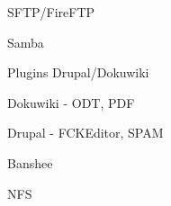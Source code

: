 \documentclass[spanish]{beamer}
\begin{document}
\begin{frame}{SFTP/FireFTP}
\end{frame}
\begin{frame}{Samba}
\end{frame}
\begin{frame}{Plugins Drupal/Dokuwiki}
\end{frame}
\begin{frame}{Dokuwiki - ODT, PDF}
\end{frame}
\begin{frame}{Drupal - FCKEditor, SPAM}
\end{frame}
\begin{frame}{Banshee}
\end{frame}
\begin{frame}{NFS}
\end{frame}
\end{document}
